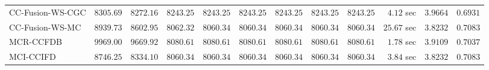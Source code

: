 \begin{table}[H]
\begin{tabular}{lrrrrrrrrrrr}
    CC-Fusion-WS-CGC & $      8305.69$ & $      8272.16$ & $      8243.25$ & $      8243.25$ & $      8243.25$ & $      8243.25$ & $      8243.25$ & $      8243.25$ & $         4.12$ sec    & $       3.9664$  & $       0.6931$ \\ 
     CC-Fusion-WS-MC & $      8939.73$ & $      8602.95$ & $      8062.32$ & $      8060.34$ & $      8060.34$ & $      8060.34$ & $      8060.34$ & $      8060.34$ & $        25.67$ sec    & $       3.8232$  & $       0.7083$ \\ 
\cmidrule{1-1} 
           MCR-CCFDB & $      9969.00$ & $      9669.92$ & $      8080.61$ & $      8080.61$ & $      8080.61$ & $      8080.61$ & $      8080.61$ & $      8080.61$ & $         1.78$ sec    & $       3.9109$  & $       0.7037$ \\ 
\cmidrule{1-1} 
           MCI-CCIFD & $      8746.25$ & $      8334.10$ & $      8060.34$ & $      8060.34$ & $      8060.34$ & $      8060.34$ & $      8060.34$ & $      8060.34$ & $         3.84$ sec    & $       3.8232$  & $       0.7083$ \\ 
\bottomrule
\end{tabular}
\end{table}

